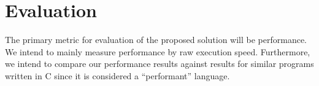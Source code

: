\documentclass[preprint,10pt,numbers]{sigplanconf}
\begin{document}

    

  \section{Evaluation}
  The primary metric for evaluation of the proposed solution will be performance. We intend to mainly measure performance by raw execution speed. Furthermore, we intend to compare our performance results against results for similar programs written in C since it is considered a ``performant'' language. 
\end{document}
